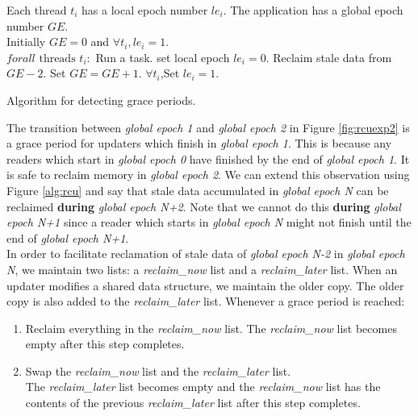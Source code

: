 \documentclass[a4paper,marginparwidth=50pt,marginparsep=10pt]{article}
\begin{document}
\begin{algorithm}[float=tph]
\begin{algorithmic}
{
\STATE Each thread $t_i$ has a local epoch number $le_i$.
\STATE The application has a global epoch number $GE$.\\
\STATE Initially  $GE=0$ and $\forall t_i, le_i=1$. \\
\STATE $forall \mbox{ threads }t_i:$
\STATE Run a task.
\STATE set local epoch  $le_i=0$.
  \STATE Reclaim stale data from $GE-2$.
  \STATE Set $GE=GE+1$.
  \STATE $\forall t_i$,Set $le_i=1$.
\ENDIF
\ENDWHILE
}
\caption{Algorithm for detecting grace periods.}
\label{alg:rcu}
\end{algorithmic}
\end{algorithm}
The transition between \emph{global epoch 1} and \emph{global epoch 2} in Figure \ref{fig:rcuexp2} is a grace period for updaters which finish in \emph{global epoch 1}. This is because any readers which start in \emph{global epoch 0} have finished by the end of \emph{global epoch 1}. It is safe to reclaim memory in \emph{global epoch 2}. We can extend this observation using Figure \ref{alg:rcu} and say that stale data accumulated in \emph{global epoch N} can be reclaimed \textbf{during} \emph{global epoch N+2}. Note that we cannot do this \textbf{during} \emph{global epoch N+1} since a reader which starts in \emph{global epoch N} might not finish until the end of \emph{global epoch N+1}.\\

In order to facilitate reclamation of stale data of \emph{global epoch N-2} in \emph{global epoch N}, we maintain two lists: a \emph{reclaim\_now} list and a \emph{reclaim\_later} list. When an updater modifies a shared data structure, we maintain the older copy. The older copy is also added to the \emph{reclaim\_later} list. Whenever a grace period is reached:
\begin{enumerate}
\item Reclaim everything in the \emph{reclaim\_now} list. The \emph{reclaim\_now} list becomes empty after this step completes.
\item Swap the \emph{reclaim\_now} list and the \emph{reclaim\_later} list.\\
The \emph{reclaim\_later} list becomes empty and the \emph{reclaim\_now} list has the contents of the previous \emph{reclaim\_later} list after this step completes.
\end{enumerate}
\end{document}
